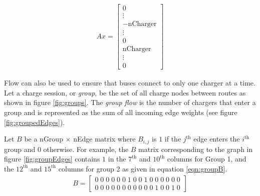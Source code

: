 \begin{align}\label{eqn:cFlow}
	Ax = \begin{bmatrix} 0 \\ \vdots \\ -\text{nCharger} \\ \vdots \\ 0 \\ \text{nCharger} \\ \vdots \\ 0\end{bmatrix}
\end{align}

\par Flow can also be used to ensure that buses connect to only one charger at a time. Let a charge session, or \textit{group}, be the set of all charge nodes between routes as shown in figure \ref{fig:groups}. The \textit{group flow} is the number of chargers that enter a group and is represented as the sum of all incoming edge weights (see figure \ref{fig:groupedEdges}). 
\par Let $B$ be a nGroup $\times$ nEdge matrix where $B_{i,j}$ is $1$ if the $j^{\text{th}}$ edge enters the $i^{\text{th}}$ group and $0$ otherwise. For example, the $B$ matrix corresponding to the graph in figure \ref{fig:groupEdges} contains $1$ in the $7^{\text{th}}$ and $10^{\text{th}}$ columns for Group 1, and the $12^{\text{th}}$ and $15^{\text{th}}$ columns for group 2 as given in equation \ref{eqn:groupB}.
\begin{align}\label{eqn:groupB}
	B = \begin{bmatrix}0 \; 0 \; 0 \; 0 \; 0 \; 0 \; 1 \; 0 \; 0 \; 1 \; 0 \; 0 \; 0 \; 0 \; 0 \; 0\\
	                   0 \; 0 \; 0 \; 0 \; 0 \; 0 \; 0 \; 0 \; 0 \; 0 \; 0 \; 1 \; 0 \; 0 \; 1 \; 0\end{bmatrix}
\end{align}

